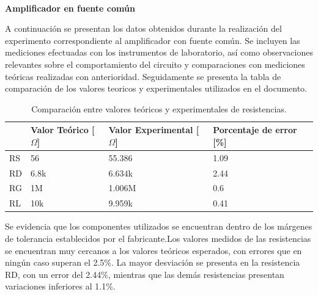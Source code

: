 \documentclass[journal]{IEEEtran}
\begin{document}
	\newline
	\\
\textbf{Amplificador en fuente común}
\par A continuación se presentan los datos obtenidos durante la realización del experimento correspondiente al amplificador con fuente común. Se incluyen las mediciones efectuadas con los instrumentos de laboratorio, así como observaciones relevantes sobre el comportamiento del circuito y comparaciones con mediciones teóricas realizadas con anterioridad. Seguidamente se presenta la tabla de comparación de los valores teoricos y experimentales utilizados en el documento.

\begin{table}[h]
    \caption{Comparación entre valores teóricos y experimentales de resistencias.}
    \centering
    \renewcommand{\arraystretch}{1.2} %
    \begin{tabular}{|l|p{2cm}|p{2cm}|p{2cm}|}
        \hline
        & \textbf{Valor Teórico [$\Omega$]} &
        \textbf{Valor Experimental [$\Omega$]} & 
        \textbf{Porcentaje de error [\%]} \\
        \hline
        RS & 56  & 55.386  & 1.09 \\
        \hline
        RD & 6.8k   & 6.634k  & 2.44 \\
        \hline
        RG & 1M & 1.006M & 0.6 \\
        \hline
        RL & 10k & 9.959k & 0.41 \\
        \hline
    \end{tabular}
    \label{tab:resistencias2}
\end{table}
\par Se evidencia que los componentes utilizados se encuentran dentro de los márgenes de tolerancia establecidos por el fabricante.Los valores medidos de las resistencias se encuentran muy cercanos a los valores teóricos esperados, con errores que en ningún caso superan el 2.5\%. La mayor desviación se presenta en la resistencia RD, con un error del 2.44\%, mientras que las demás resistencias presentan variaciones inferiores al 1.1\%.
\end{document}
